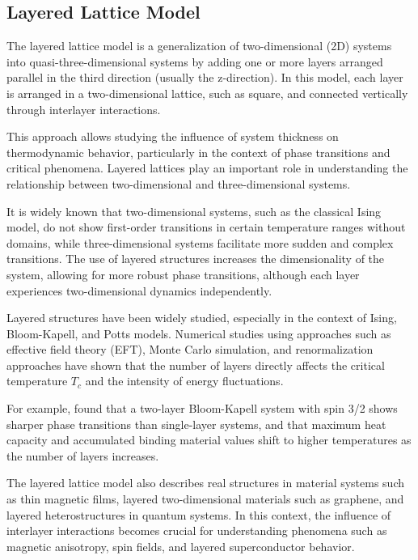 \subsection{Layered Lattice Model}

The layered lattice model is a generalization of two-dimensional (2D) systems into quasi-three-dimensional systems by adding one or more layers arranged parallel in the third direction (usually the z-direction). In this model, each layer is arranged in a two-dimensional lattice, such as square, and connected vertically through interlayer interactions.

This approach allows studying the influence of system thickness on thermodynamic behavior, particularly in the context of phase transitions and critical phenomena. Layered lattices play an important role in understanding the relationship between two-dimensional and three-dimensional systems.

It is widely known that two-dimensional systems, such as the classical Ising model, do not show first-order transitions in certain temperature ranges without domains, while three-dimensional systems facilitate more sudden and complex transitions. The use of layered structures increases the dimensionality of the system, allowing for more robust phase transitions, although each layer experiences two-dimensional dynamics independently.

Layered structures have been widely studied, especially in the context of Ising, Bloom-Kapell, and Potts models. Numerical studies using approaches such as effective field theory (EFT), Monte Carlo simulation, and renormalization approaches have shown that the number of layers directly affects the critical temperature $T_c$ and the intensity of energy fluctuations.

For example, \cite{Ertaş2014} found that a two-layer Bloom-Kapell system with spin 3/2 shows sharper phase transitions than single-layer systems, and that maximum heat capacity and accumulated binding material values shift to higher temperatures as the number of layers increases.

The layered lattice model also describes real structures in material systems such as thin magnetic films, layered two-dimensional materials such as graphene, and layered heterostructures in quantum systems. In this context, the influence of interlayer interactions becomes crucial for understanding phenomena such as magnetic anisotropy, spin fields, and layered superconductor behavior.

